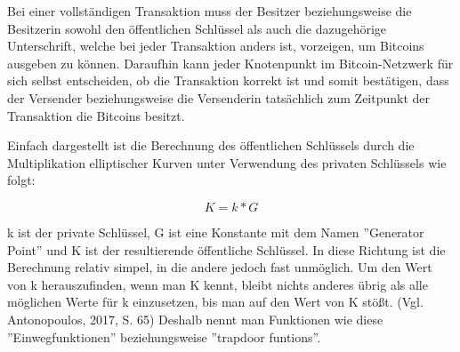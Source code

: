 Bei einer vollständigen Transaktion muss der Besitzer beziehungsweise die Besitzerin sowohl den öffentlichen Schlüssel als auch die
dazugehörige Unterschrift, welche bei jeder Transaktion anders ist, vorzeigen, um Bitcoins ausgeben zu können. Daraufhin kann 
jeder Knotenpunkt im Bitcoin-Netzwerk für sich selbst entscheiden, ob die Transaktion korrekt ist und somit bestätigen, dass 
der Versender beziehungsweise die Versenderin tatsächlich zum Zeitpunkt der Transaktion die Bitcoins besitzt.

Einfach dargestellt ist die Berechnung des öffentlichen Schlüssels durch die Multiplikation elliptischer Kurven unter Verwendung
des privaten Schlüssels wie folgt:

\[ K = k * G \]

k ist der private Schlüssel, G ist eine Konstante mit dem Namen ''Generator Point'' und K ist der resultierende öffentliche Schlüssel.
In diese Richtung ist die Berechnung relativ simpel, in die andere jedoch fast unmöglich. Um den Wert von k herauszufinden, wenn
man K kennt, bleibt nichts anderes übrig als alle möglichen Werte für k einzusetzen, bis man auf den Wert von K stößt. (Vgl. 
Antonopoulos, 2017, S. 65) Deshalb nennt man Funktionen wie diese ''Einwegfunktionen'' beziehungsweise ''trapdoor funtions''.



